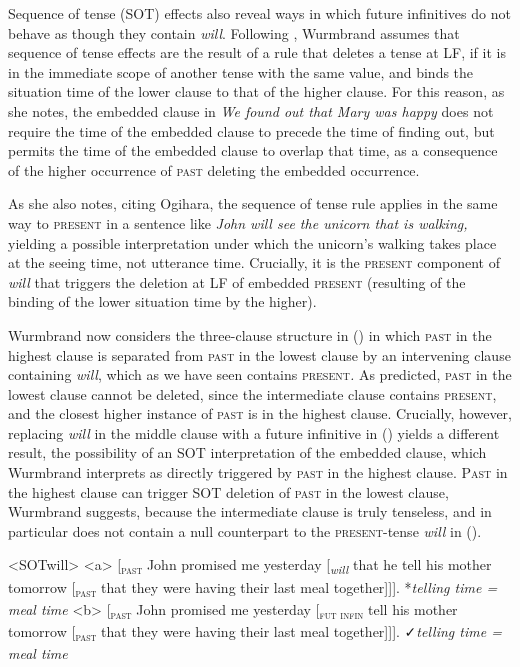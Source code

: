 \documentclass[output=paper]{langscibook}
\begin{document}
\noindent Sequence of tense (SOT) effects also reveal ways in which future infinitives do not behave as though they contain \textit{will}. Following \citet{Ogihara1996}, Wurmbrand assumes that sequence of tense effects are the result of a rule that deletes a tense at LF, if it is in the immediate scope of another tense with the same value, and binds the situation time of the lower clause to that of the higher clause. For this reason, as she notes, the embedded clause in \textit{We found out that Mary was happy} does not require the time of the embedded clause to precede the time of finding out, but permits the time of the embedded clause to overlap that time, as a consequence of the higher occurrence of \textsc{past }deleting the embedded occurrence. 

As she also notes, citing Ogihara, the sequence of tense rule applies in the same way to \textsc{present} in a sentence like \textit{John will see the unicorn that is walking, }yielding a possible interpretation under which the unicorn's walking takes place at the seeing time, not utterance time. Crucially, it is the \textsc{present} component of \textit{will }that triggers the deletion at LF of embedded \textsc{present} (resulting of the binding of the lower situation time by the higher). 

Wurmbrand now considers the three-clause structure in () in which \textsc{past }in the highest clause\textsc{ }is separated from \textsc{past} in the lowest clause\textsc{ }by an intervening clause containing \textit{will}, which as we have seen contains \textsc{present}\textit{. }As predicted, \textsc{past }in the lowest clause cannot be deleted, since the intermediate clause contains \textsc{present}, and the closest higher instance of \textsc{past }is in the highest clause. Crucially, however, replacing \textit{will} in the middle clause with a future infinitive in () yields a different result, the possibility of an SOT interpretation of the embedded clause, which Wurmbrand interprets as directly triggered by \textsc{past} in the highest clause. \textsc{Past }in the highest clause can trigger SOT deletion of \textsc{past }in the lowest clause, Wurmbrand suggests, because the intermediate clause is truly tenseless, and in particular does not contain a null counterpart to the \textsc{present}-tense \textit{will} in (). 

\noindent \noindent \pex<SOTwill>
\a<a>
{[}\textsubscript{\textsc{past}} John promised me yesterday {[}\textsubscript{\textit{will}} that he  tell his mother tomorrow {[}\textsubscript{\textsc{past}} that they were having their last meal together{]]]}.\smallbreak  
*\textit{telling time = meal time}
\a<b> {[}\textsubscript{\textsc{past}} John promised me yesterday {[}\textsubscript{\textsc{fut infin}}  tell his mother tomorrow {[}\textsubscript{\textsc{past}} that they were having their last meal together{]]]}.\smallbreak 
✓\textit{telling time = meal time}
\xe
\end{document}
